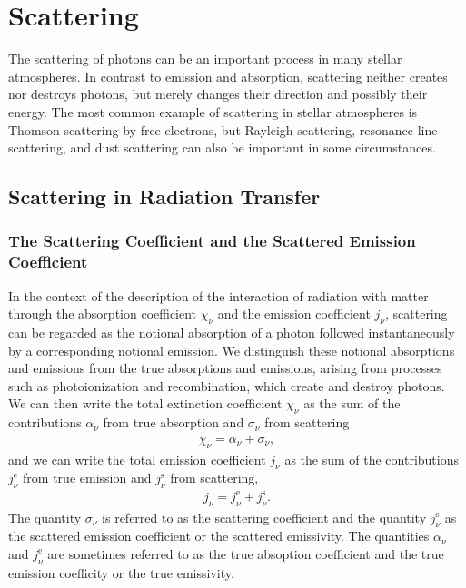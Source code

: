 
\chapter{Scattering}

The scattering of photons can be an important process in
many stellar atmospheres. In contrast to emission and
absorption, scattering neither creates nor destroys photons,
but merely changes their direction and possibly their
energy. The most common example of scattering in stellar
atmospheres is Thomson scattering by free electrons, but
Rayleigh scattering, resonance line scattering, and dust
scattering can also be important in some circumstances.



\section{Scattering in Radiation Transfer}

\subsection{The Scattering Coefficient and the Scattered
Emission Coefficient}

In the context of the description of the interaction of
radiation with matter through the absorption coefficient
$\chi_\nu$ and the emission coefficient $j_\nu$, scattering
can be regarded as the notional absorption of a photon
followed instantaneously by a corresponding notional
emission. We distinguish these notional absorptions and
emissions from the true absorptions and emissions, arising
from processes such as photoionization and recombination,
which create and destroy photons. We can then write the
total extinction coefficient $\chi_\nu$ as the sum of the
contributions $\alpha_\nu$ from true absorption and
$\sigma_\nu$ from scattering
\begin{align}
\chi_\nu = \alpha_\nu + \sigma_\nu,
\end{align}
and we can write the total emission coefficient $j_\nu$ as
the sum of the contributions $j_\nu^\mathrm{e}$ from true
emission and $j_\nu^\mathrm{s}$ from scattering,
\begin{align}
j_\nu = j_\nu^\mathrm{e} + j_\nu^\mathrm{s}.
\end{align}
The quantity $\sigma_\nu$ is referred to as the scattering
coefficient and the quantity $j_\nu^\mathrm{s}$ as the
scattered emission coefficient or the scattered emissivity.
The quantities $\alpha_\nu$ and $j_\nu^\mathrm{e}$ are
sometimes referred to as the true absoption coefficient and
the true emission coefficity or the true emissivity.


